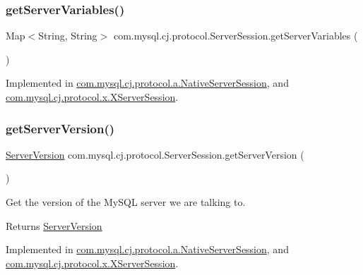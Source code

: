 \subsubsection{\texorpdfstring{get\+Server\+Variables()}{getServerVariables()}}
{\footnotesize\ttfamily Map$<$String, String$>$ com.\+mysql.\+cj.\+protocol.\+Server\+Session.\+get\+Server\+Variables (\begin{DoxyParamCaption}{ }\end{DoxyParamCaption})}



Implemented in \mbox{\hyperlink{classcom_1_1mysql_1_1cj_1_1protocol_1_1a_1_1_native_server_session_a5d1f9481bc93bb7f3a7a1ab35298b626}{com.\+mysql.\+cj.\+protocol.\+a.\+Native\+Server\+Session}}, and \mbox{\hyperlink{classcom_1_1mysql_1_1cj_1_1protocol_1_1x_1_1_x_server_session_a142b6d30c477a3acc641a55d3c7cc42b}{com.\+mysql.\+cj.\+protocol.\+x.\+X\+Server\+Session}}.

\mbox{\label{interfacecom_1_1mysql_1_1cj_1_1protocol_1_1_server_session_a96ad6ba424e7065b39d9b83dae49834a}} 
\subsubsection{\texorpdfstring{get\+Server\+Version()}{getServerVersion()}}
{\footnotesize\ttfamily \mbox{\hyperlink{classcom_1_1mysql_1_1cj_1_1_server_version}{Server\+Version}} com.\+mysql.\+cj.\+protocol.\+Server\+Session.\+get\+Server\+Version (\begin{DoxyParamCaption}{ }\end{DoxyParamCaption})}

Get the version of the My\+S\+QL server we are talking to.

\begin{DoxyReturn}{Returns}
\mbox{\hyperlink{classcom_1_1mysql_1_1cj_1_1_server_version}{Server\+Version}} 
\end{DoxyReturn}


Implemented in \mbox{\hyperlink{classcom_1_1mysql_1_1cj_1_1protocol_1_1a_1_1_native_server_session_a38d2e0173e10f1f3b55a04c34c9fa8e8}{com.\+mysql.\+cj.\+protocol.\+a.\+Native\+Server\+Session}}, and \mbox{\hyperlink{classcom_1_1mysql_1_1cj_1_1protocol_1_1x_1_1_x_server_session_a55b0588085914fbaa110c3e593efec8f}{com.\+mysql.\+cj.\+protocol.\+x.\+X\+Server\+Session}}.

